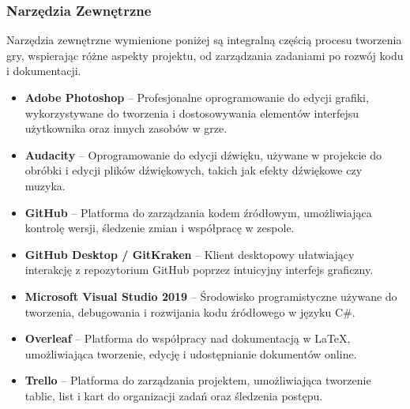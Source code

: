 \subsubsection{Narzędzia Zewnętrzne}
Narzędzia zewnętrzne wymienione poniżej są integralną częścią procesu tworzenia gry, wspierając różne aspekty projektu, od zarządzania zadaniami po rozwój kodu i dokumentacji.
\begin{itemize}
\item \textbf{Adobe Photoshop} -- Profesjonalne oprogramowanie do edycji grafiki, wykorzystywane do tworzenia i dostosowywania elementów interfejsu użytkownika oraz innych zasobów w grze.
\item \textbf{Audacity} -- Oprogramowanie do edycji dźwięku, używane w projekcie do obróbki i edycji plików dźwiękowych, takich jak efekty dźwiękowe czy muzyka.
\item \textbf{GitHub} -- Platforma do zarządzania kodem źródłowym, umożliwiająca kontrolę wersji, śledzenie zmian i współpracę w zespole.
\item \textbf{GitHub Desktop / GitKraken} -- Klient desktopowy ułatwiający interakcję z repozytorium GitHub poprzez intuicyjny interfejs graficzny.
\item \textbf{Microsoft Visual Studio 2019} -- Środowisko programistyczne używane do tworzenia, debugowania i rozwijania kodu źródłowego w języku C\#.
\item \textbf{Overleaf} -- Platforma do współpracy nad dokumentacją w LaTeX, umożliwiająca tworzenie, edycję i udostępnianie dokumentów online.
\item \textbf{Trello} -- Platforma do zarządzania projektem, umożliwiająca tworzenie tablic, list i kart do organizacji zadań oraz śledzenia postępu.
\end{itemize}